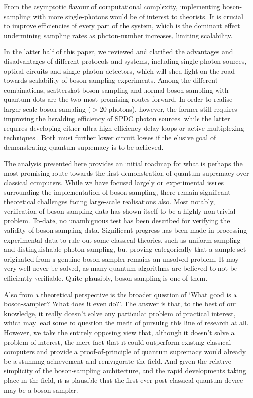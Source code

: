 \documentclass[aps,rmp,twocolumn,amsmath,amssymb,nofootinbib,superscriptaddress]{revtex4}
\begin{document}
From the asymptotic flavour of computational complexity, implementing boson-sampling with more single-photons would be of interest to theorists. It is crucial to improve efficiencies of every part of the system, which is the dominant effect undermining sampling rates as photon-number increases, limiting scalability.

In the latter half of this paper, we reviewed and clarified the advantages and disadvantages of different protocols and systems, including single-photon sources, optical circuits and single-photon detectors, which will shed light on the road towards scalability of boson-sampling experiments. Among the different combinations, scattershot boson-sampling and normal boson-sampling with quantum dots are the two most promising routes forward. In order to realise larger scale boson-sampling ($>20$ photons), however, the former still requires improving the heralding efficiency of SPDC photon sources, while the latter requires developing either ultra-high efficiency delay-loops or active multiplexing techniques \cite{bib:89}. Both must further lower circuit losses if the elusive goal of demonstrating quantum supremacy is to be achieved.

The analysis presented here provides an initial roadmap for what is perhaps the most promising route towards the first demonstration of quantum supremacy over classical computers. While we have focused largely on experimental issues surrounding the implementation of boson-sampling, there remain significant theoretical challenges facing large-scale realisations also. Most notably, verification of boson-sampling data has shown itself to be a highly non-trivial problem. To-date, no unambiguous test has been described for verifying the validity of boson-sampling data. Significant progress has been made in processing experimental data to rule out some classical theories, such as uniform sampling and distinguishable photon sampling, but proving categorically that a sample set originated from a genuine boson-sampler remains an unsolved problem. It may very well never be solved, as many quantum algorithms are believed to not be efficiently verifiable. Quite plausibly, boson-sampling is one of them.

Also from a theoretical perspective is the broader question of `What good is a boson-sampler? What does it even do?'. The answer is that, to the best of our knowledge, it really doesn't solve any particular problem of practical interest, which may lead some to question the merit of pursuing this line of research at all. However, we take the entirely opposing view that, although it doesn't solve a problem of interest, the mere fact that it could outperform existing classical computers and provide a proof-of-principle of quantum supremacy would already be a stunning achievement and reinvigorate the field. And given the relative simplicity of the boson-sampling architecture, and the rapid developments taking place in the field, it is plausible that the first ever post-classical quantum device may be a boson-sampler.
\end{document}
